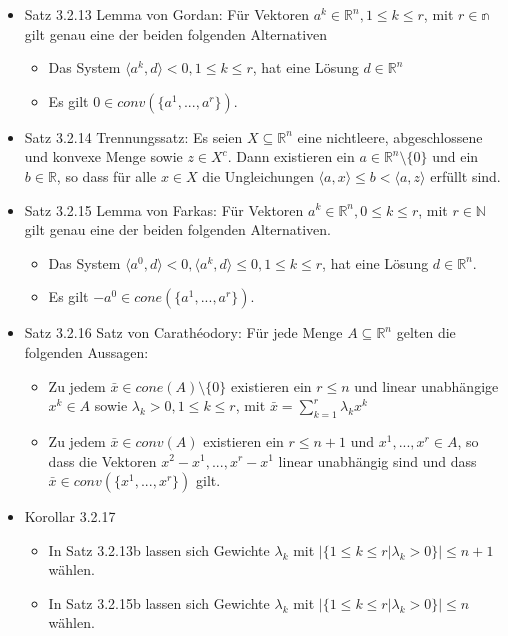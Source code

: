 \documentclass[paper=a4, fontsize=11pt]{scrartcl} %
\numberwithin{equation}{section} %
\numberwithin{figure}{section} %
\numberwithin{table}{section} %
\begin{document}
\begin{itemize}
  \item Satz 3.2.13 Lemma von Gordan: Für Vektoren $a^k \in \mathbb{R}^n, 1 \le k \le r$, mit $r \in \mathbb{n}$ gilt genau eine der beiden folgenden Alternativen
  \begin{itemize}
    \item Das System $\langle a^k,d\rangle < 0, 1 \le k \le r$, hat eine Lösung $d \in \mathbb{R}^n$
    \item Es gilt $0 \in conv(\{a^1,...,a^r\})$.
  \end{itemize}
  \item Satz 3.2.14 Trennungssatz: Es seien $X \subseteq \mathbb{R}^n$ eine nichtleere, abgeschlossene und konvexe Menge sowie $z \in X^c$. Dann existieren ein $a \in \mathbb{R}^n \setminus	 \{ 0 \}$ und ein $b \in \mathbb{R}$, so dass für alle $x \in X$ die Ungleichungen $\langle a,x\rangle \le b < \langle a,z\rangle$ erfüllt sind.
  \item Satz 3.2.15 Lemma von Farkas: Für Vektoren $a^k \in \mathbb{R}^n, 0 \le k \le r$, mit $r \in \mathbb{N}$ gilt genau eine der beiden folgenden Alternativen.
  \begin{itemize}
    \item Das System $\langle a^0,d \rangle < 0, \langle a^k,d \rangle \le 0, 1 \le k \le r$, hat eine Lösung $d \in \mathbb{R}^n$.
    \item Es gilt $-a^0 \in cone(\{a^1,...,a^r\})$.
  \end{itemize}
  \item Satz 3.2.16 Satz von Carathéodory: Für jede Menge $A \subseteq \mathbb{R}^n$ gelten die folgenden Aussagen:
  \begin{itemize}
    \item Zu jedem $\bar{x} \in cone(A) \setminus \{ 0 \}$ existieren ein $r \le n$ und linear unabhängige $x^k \in A$ sowie $\lambda_k > 0, 1 \le k \le r$, mit $\bar{x} = \sum\limits_{k=1}^r \lambda_k x^k$
    \item Zu jedem $\bar{x} \in conv(A)$ existieren ein $r \le n + 1$ und $x^1, ..., x^r \in A$, so dass die Vektoren $x^2 - x^1, ..., x^r - x^1$ linear unabhängig sind und dass $\bar{x} \in conv(\{x^1,...,x^r\})$ gilt.
  \end{itemize}
  \item Korollar 3.2.17
  \begin{itemize}
    \item In Satz 3.2.13b lassen sich Gewichte $\lambda_k$ mit $|\{1 \le k \le r |\lambda_k > 0\} | \le n+1$ wählen.
    \item In Satz 3.2.15b lassen sich Gewichte $\lambda_k$ mit $|\{1 \le k \le r |\lambda_k > 0\} | \le n$ wählen.
  \end{itemize}
\end{itemize}
\end{document}
